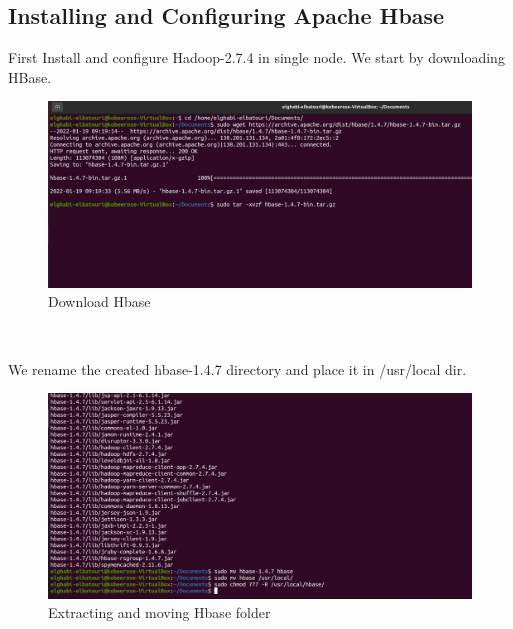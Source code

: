 \begin{spacing}{1.2}
\section{Installing and Configuring Apache Hbase }
\par First Install and configure Hadoop-2.7.4 in single node. We start by downloading HBase.
\\
\begin{figure}[!htb] 
\begin{center} 
\includegraphics[width=1\linewidth]{Pictures/HBase/Configuring Hbase in Standalone & Pseudo-distributed mode/Installing and Configuring Apache Hbase/Download Hbase} 
\end{center} 
\caption{Download Hbase} 
\end{figure}  \FloatBarrier
\\

\par We rename the created hbase-1.4.7 directory and place it in /usr/local dir.
\\
\begin{figure}[!htb] 
\begin{center} 
\includegraphics[width=1\linewidth]{Pictures/HBase/Configuring Hbase in Standalone & Pseudo-distributed mode/Installing and Configuring Apache Hbase/Extracting and moving Hbase folder} 
\end{center} 
\caption{Extracting and moving Hbase folder} 
\end{figure}  \FloatBarrier
\\


\end{spacing}
